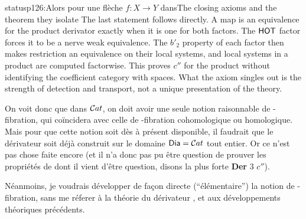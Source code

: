 \begin{dcomment}{status}{p126:Alors pour une flèche $f : X \to Y$ dans}{The closing axioms and the theorem they isolate}
The last statement follows directly. A map is an equivalence for the product derivator exactly when it is one for both factors. The $\mathsf{HOT}$ factor forces it to be a nerve weak equivalence. The $b'_2$ property of each factor then makes restriction an equivalence on their local systems, and local systems in a product are computed factorwise. This proves $c''$ for the product without identifying the coefficient category with spaces. What the axiom singles out is the strength of detection and transport, not a unique presentation of the theory.
\end{dcomment}


On voit donc que dans $\mathcal{C}at$, on doit avoir une seule notion raisonnable de \HOT-fibration, qui coïncidera avec celle de \HOT-fibration cohomologique ou homologique. Mais pour que cette notion soit dès à présent disponible, il faudrait que le dérivateur \HOT{} soit déjà construit sur le domaine $\text{\ensuremath{\mathsf{Dia}}} = \mathcal{C}at$ tout entier. Or ce n'est pas chose faite encore (et il n'a donc pas pu être question de prouver les propriétés de \HOT{} dont il vient d'être question, disons la plus forte \textbf{Der} 3 $c''$).

Néanmoins, je voudrais développer de façon directe (“élémentaire”) la notion de \Hot-fibration, sans me réferer à la théorie du dérivateur \HOT, et aux développements théoriques précédents. %


